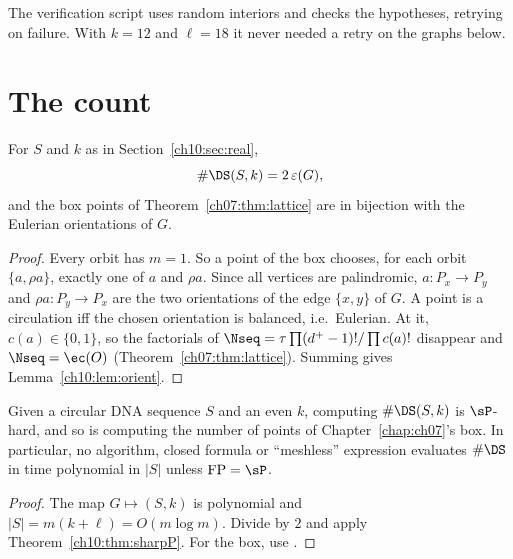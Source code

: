 The verification script uses random interiors and checks the hypotheses, retrying on failure. With
$k=12$ and $\ell=18$ it never needed a retry on the graphs below.

\section{The count}\label{ch10:sec:count}

\begin{theorem}\label{ch10:thm:main}
For $S$ and $k$ as in Section~\ref{ch10:sec:real},
\[
\#\DS(S,k)=2\,\varepsilon(G),
\]
and the box points of Theorem~\ref{ch07:thm:lattice} are in bijection with the Eulerian orientations of $G$.
\end{theorem}

\begin{proof}
Every orbit has $m=1$. So a point of the box chooses, for each orbit $\{a,\rho a\}$, exactly one of $a$
and $\rho a$. Since all vertices are palindromic, $a\colon P_x\to P_y$ and $\rho a\colon P_y\to P_x$
are the two orientations of the edge $\{x,y\}$ of $G$. A point is a circulation iff the chosen
orientation is balanced, i.e.\ Eulerian. At it, $c(a)\in\{0,1\}$, so the factorials of
$\Nseq=\tau\prod(d^+-1)!/\prod c(a)!$ disappear and $\Nseq=\ec(O)$ (Theorem~\ref{ch07:thm:lattice}). Summing gives
Lemma~\ref{ch10:lem:orient}.
\end{proof}

\begin{corollary}\label{ch10:cor:hard}
Given a circular DNA sequence $S$ and an even $k$, computing $\#\DS(S,k)$ is $\sP$-hard, and so is
computing the number of points of Chapter~\ref{chap:ch07}'s box. In particular, no algorithm, closed formula or
``meshless'' expression evaluates $\#\DS$ in time polynomial in $|S|$ unless $\mathrm{FP}=\sP$.
\end{corollary}

\begin{proof}
The map $G\mapsto(S,k)$ is polynomial and $|S|=m(k+\ell)=O(m\log m)$. Divide by $2$ and apply
Theorem~\ref{ch10:thm:sharpP}. For the box, use \cite{MW96}.
\end{proof}

